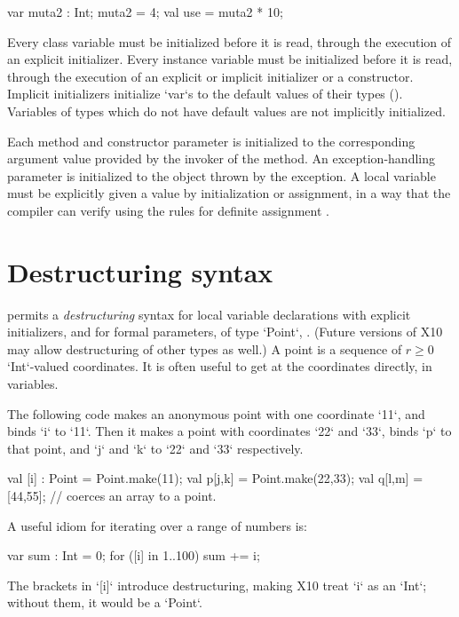 \begin{xten}
  var muta2 : Int;
  muta2 = 4;
  val use = muta2 * 10;
\end{xten}


Every class variable must be initialized before it is read, through
the execution of an explicit initializer. Every
instance variable must be initialized before it is read, through the
execution of an explicit or implicit initializer or a constructor.
Implicit initializers initialize \xcd`var`s to the default values of their
types (). Variables of types which do not have default
values are not implicitly initialized.



Each method and constructor parameter is initialized to the
corresponding argument value provided by the invoker of the method. An
exception-handling parameter is initialized to the object thrown by
the exception. A local variable must be explicitly given a value by
initialization or assignment, in a way that the compiler can verify
using the rules for definite assignment \cite[\S~16]{jls2}.


\section{Destructuring syntax}
\Xten{} permits a \emph{destructuring} syntax for local variable
declarations with explicit initializers,  and for formal parameters, of type \xcd`Point`, .
(Future versions of X10 may allow destructuring of other types as well.) 
A point is a sequence of {$r \ge 0$} \xcd`Int`-valued coordinates.  
It is often useful to get at the coordinates directly, in variables. 

The following code makes an anonymous point with one coordinate \xcd`11`, and
binds \xcd`i` to \xcd`11`.  Then it makes a point with coordinates \xcd`22`
and \xcd`33`, binds \xcd`p` to that point, and \xcd`j` and \xcd`k` to \xcd`22`
and \xcd`33` respectively.
\begin{xten}
val [i] : Point = Point.make(11);
val p[j,k] = Point.make(22,33);
val q[l,m] = [44,55]; // coerces an array to a point.
\end{xten}

A useful idiom for iterating over a range of numbers is: 
\begin{xten}
var sum : Int = 0;
for ([i] in 1..100) sum += i;
\end{xten}
\noindent
The brackets in \xcd`[i]` introduce destructuring, making X10 treat \xcd`i`
as an \xcd`Int`; without them, it would be a \xcd`Point`.  

